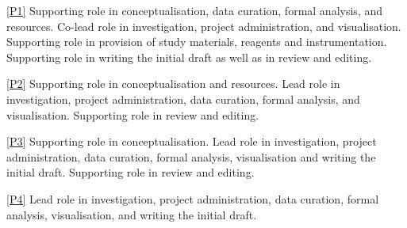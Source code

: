 \documentclass[webedition,openright,titles,swedish,english]{LuaUUThesis}\usepackage[]{graphicx}\usepackage[]{xcolor}
\begin{document}
\begin{authorscontributions}
   \item[\cref{P1}]
   Supporting role in conceptualisation, data curation, formal analysis, and resources.
   Co-lead role in investigation, project administration, and visualisation.
   Supporting role in provision of study materials, reagents and instrumentation.
   Supporting role in writing the initial draft as well as in review and editing.
   \item[\cref{P2}]
   Supporting role in conceptualisation and resources.
   Lead role in investigation, project administration, data curation,
   formal analysis, and visualisation.
   Supporting role in review and editing.
   \item[\cref{P3}]
   Supporting role in conceptualisation.
   Lead role in investigation, project administration, data curation,
   formal analysis, visualisation and writing the initial draft.
   Supporting role in review and editing.
   \item[\cref{P4}]
   Lead role in investigation, project administration, data curation, formal analysis,
   visualisation, and writing the initial draft.
\end{authorscontributions}
\clearpage
%
\end{document}
